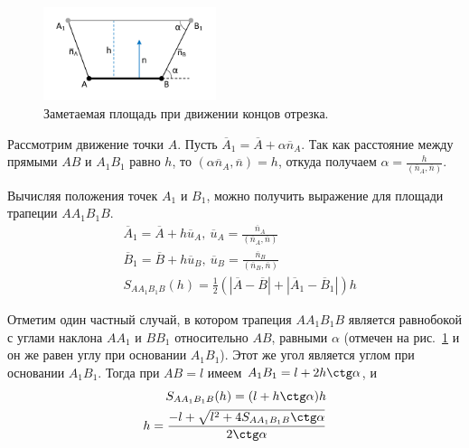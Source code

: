 \begin{figure}[ht]
\centering
\includegraphics[width=0.45\textwidth]{./pics/text_1_geo_prim/trapezoid_partial.pdf}
\caption{Заметаемая площадь при движении концов отрезка.}
\label{fig:text_1_geo_prim_trapezoid_partial}
\end{figure}

Рассмотрим движение точки $A$.
Пусть $\overline{A}_1 = \overline{A} + \alpha \overline{n}_A$.
Так как расстояние между прямыми $AB$ и $A_1B_1$ равно $h$, то $(\alpha \overline{n}_A, \overline{n}) = h$, откуда получаем $\alpha = \frac{h}{(\overline{n}_A, \overline{n})}$.

Вычисляя положения точек $A_1$ и $B_1$, можно получить выражение для площади трапеции $AA_1B_1B$.
\begin{equation}\label{eqn:text_1_geo_prim_aa1b1b}
	\begin{aligned}
		& \overline{A}_1 = \overline{A} + h \overline{u}_A, \ \overline{u}_A = \frac{\overline{n}_A}{(\overline{n}_A, \overline{n})} \\
		& \overline{B}_1 = \overline{B} + h \overline{u}_B, \ \overline{u}_B = \frac{\overline{n}_B}{(\overline{n}_B, \overline{n})} \\
		& S_{AA_1B_1B}(h) = \frac{1}{2} \left( |\overline{A} - \overline{B}| + |\overline{A}_1 - \overline{B}_1| \right) h
	\end{aligned}
\end{equation}

Отметим один частный случай, в котором трапеция $AA_1B_1B$ является равнобокой с углами наклона $AA_1$ и $BB_1$ относительно $AB$, равными $\alpha$ (отмечен на рис.~\ref{fig:text_1_geo_prim_trapezoid_partial} и он же равен углу при основании $A_1B_1$).
Этот же угол является углом при основании $A_1B_1$.
Тогда при $AB = l$ имеем $A_1B_1 = l + 2 h \ctg \alpha$, и
\begin{equation}\label{eqn:text_1_geo_prim_trapezium_h_from_s}
	\begin{aligned}
		S_{AA_1B_1B}(h) = (l + h \ctg \alpha) h \\
		h = \frac{-l + \sqrt{l^2 + 4 S_{AA_1B_1B} \ctg \alpha}}{2 \ctg \alpha}
	\end{aligned}
\end{equation}

